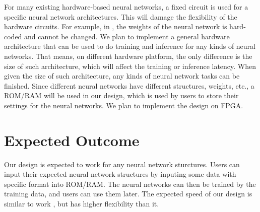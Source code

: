\documentclass[conference]{IEEEtran}
\begin{document}
For many existing hardware-based neural networks, a fixed circuit is used for a specific neural network architectures. This will damage the flexibility of the hardware circuits. For example, in \cite{hytnh17}, the weights of the neural network is hard-coded and cannot be changed. We plan to implement a general hardware architecture that can be used to do training and inference for any kinds of neural networks. That means, on different hardware platform, the only difference is the size of such architecture, which will affect the training or inference latency. When given the size of such architecture, any kinds of neural network tasks can be finished. Since different neural networks have different structures, weights, etc., a ROM/RAM will be used in our design, which is used by users to store their settings for the neural networks. We plan to implement the design on FPGA.

\section{Expected Outcome}

Our design is expected to work for any neural network sturctures. Users can input their expected neural network structures by inputing some data with specific format into ROM/RAM. The neural networks can then be trained by the training data, and users can use them later. The expected speed of our design is similar to work \cite{hytnh17}, but has higher flexibility than it.


 {\scriptsize }
\end{document}
